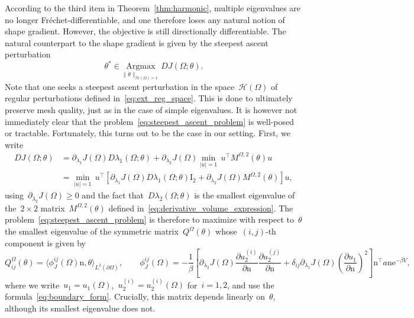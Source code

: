 \documentclass[a4]{article}
\newcommand{\e}{\mathrm{e}}
\newcommand{\n}{\mathrm{n}}
\newcommand{\1}{\mathbbm 1}
\begin{document}
According to the third item in Theorem~\ref{thm:harmonic}, multiple eigenvalues are no longer Fréchet-differentiable, and one therefore loses any natural notion of shape gradient. However, the objective is still directionally differentiable. The natural counterpart to the shape gradient is given by the steepest ascent perturbation
\begin{equation}
    \label{eq:steepest_ascent_problem}
    \theta^*\in\underset{\|\theta\|_{\mathcal H(\Omega)=1}}{\mathrm{Argmax}}\,DJ(\Omega;\theta).
\end{equation}
Note that one seeks a steepest ascent perturbation in the space~$\mathcal H(\Omega)$ of regular perturbations defined in~\eqref{eq:ext_reg_space}. This is done to ultimately preserve mesh quality, just as in the case of simple eigenvalues. It is however not immediately clear that the problem~\eqref{eq:steepest_ascent_problem} is well-posed or tractable. Fortunately, this turns out to be the case in our setting. First, we write
\begin{equation}
    \begin{aligned}
    DJ(\Omega;\theta) &= \partial_{\lambda_1} J(\Omega)D\lambda_1(\Omega;\theta)+\partial_{\lambda_2} J(\Omega)\underset{|u|=1}{\min}\,u^\top M^{\Omega,2}(\theta)u\\
    &= \underset{|u|=1}{\min}\,u^\top\left[\partial_{\lambda_1} J(\Omega)D\lambda_1(\Omega;\theta)\mathrm{I}_{2}+\partial_{\lambda_2} J(\Omega)M^{\Omega,2}(\theta)\right] u,
    \end{aligned}
\end{equation}
using~$\partial_{\lambda_2}J(\Omega)\geq 0$ and the fact that~$D\lambda_2(\Omega;\theta)$ is the smallest eigenvalue of the~$2\times2$ matrix~$M^{\Omega,2}(\theta)$ defined in~\eqref{eq:derivative_volume_expression}. The problem~\eqref{eq:steepest_ascent_problem} is therefore to maximize with respect to~$\theta$ the smallest eigenvalue of the symmetric matrix~$Q^\Omega(\theta)$ whose~$(i,j)$-th component is given by
\begin{equation}
    \label{eq:perturbation_matrix_J_boundary_form}
    Q_{ij}^{\Omega}(\theta) = \langle \phi^{ij}_{J}(\Omega)\n,\theta\rangle_{L^2(\partial\Omega)},\qquad \phi^{ij}_{J}(\Omega) = -\frac1\beta\left[\partial_{\lambda_2} J(\Omega)\frac{\partial u_2^{(i)}}{\partial\n}\frac{\partial u_2^{(j)}}{\partial\n} +\delta_{ij}\partial_{\lambda_1} J(\Omega)\left(\frac{\partial u_1}{\partial\n}\right)^2\right]\n^\top a\n\e^{-\beta V},
\end{equation}
where we write~$u_1=u_1(\Omega)$,~$u_2^{{(i)}}=u_2^{(i)}(\Omega)$ for~$i=1,2$, and use the formula~\eqref{eq:boundary_form}. Crucially, this matrix depends linearly on~$\theta$, although its smallest eigenvalue does not.
\end{document}
